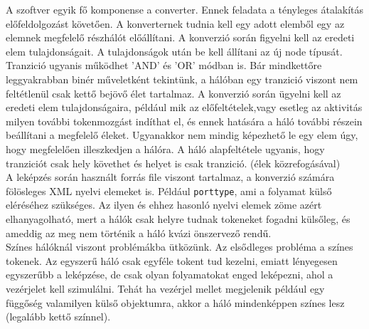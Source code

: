 
A szoftver egyik fő komponense a converter. Ennek feladata a tényleges átalakítás előfeldolgozást követően.  A konverternek tudnia kell egy adott elemből egy az elemnek megfelelő részhálót előállítani. A konverzió során figyelni kell az eredeti elem tulajdonságait. A tulajdonságok után be kell állítani az új node típusát. Tranzició ugyanis működhet 'AND' és 'OR' módban is. Bár mindkettőre leggyakrabban binér műveletként tekintünk, a hálóban egy tranzició viszont nem feltétlenül csak kettő bejövő élet tartalmaz. A konverzió során ügyelni kell az eredeti elem tulajdonságaira, például mik az előfeltételek,vagy esetleg az aktivitás milyen további tokenmozgást indíthat el, és ennek hatására a háló további részein beállítani a megfelelő éleket. Ugyanakkor nem mindig képezhető le egy elem úgy, hogy megfelelően illeszkedjen a hálóra. A háló alapfeltétele ugyanis, hogy tranziciót csak hely követhet és helyet is csak tranzició. (élek közrefogásával)\\
A leképzés során használt forrás file viszont tartalmaz, a konverzió számára fölösleges XML nyelvi elemeket is. Például \texttt{porttype}, ami a folyamat külső eléréséhez szükséges. Az ilyen és ehhez hasonló nyelvi elemek zöme azért elhanyagolható, mert a hálók csak helyre tudnak tokeneket fogadni külsőleg, és ameddig az meg nem történik a háló kvázi önszervező rendű.\\
Színes hálóknál viszont problémákba ütközünk. Az elsődleges probléma a színes tokenek. Az egyszerű háló csak egyféle tokent tud kezelni, emiatt lényegesen egyszerűbb a leképzése, de csak olyan folyamatokat enged leképezni, ahol a vezérjelet kell szimulálni. Tehát ha vezérjel mellet megjelenik például egy függőség valamilyen külső objektumra, akkor a háló mindenképpen színes lesz (legalább kettő színnel). \\

